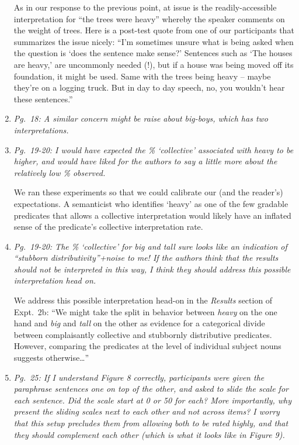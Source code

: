 \documentclass[12pt]{article}
\begin{document}
\begin{enumerate}
As in our response to the previous point, at issue is the readily-accessible interpretation for ``the trees were heavy'' whereby the speaker comments on the weight of trees. Here is a post-test quote from one of our participants that summarizes the issue nicely: ``I'm sometimes unsure what is being asked when the question is `does the sentence make sense?'  Sentences such as `The houses are heavy,' are uncommonly needed (!), but if a house was being moved off its foundation, it might be used.  Same with the trees being heavy -- maybe they're on a logging truck.  But in day to day speech, no, you wouldn't hear these sentences.''

\item \emph{Pg.~18: A similar concern might be raise about \emph{big-boys}, which has two interpretations.}



\item \emph{Pg.~19-20: I would have expected the \% `collective' associated with \emph{heavy} to be higher, and would have liked for the authors to say a little more about the relatively low \% observed.}

We ran these experiments so that we could calibrate our (and the reader's) expectations. A semanticist who identifies `heavy' as one of the few gradable predicates that allows a collective interpretation would likely have an inflated sense of the predicate's collective interpretation rate.
	
\item \emph{Pg.~19-20: The \% `collective' for \emph{big} and \emph{tall} sure looks like an indication of ``stubborn distributivity''+noise to me! If the authors think that the results should not be interpreted in this way, I think they should address this possible interpretation head on.}

We address this possible interpretation head-on in the \emph{Results} section of Expt.~2b: ``We might take the split in behavior between \emph{heavy} on the one hand and \emph{big} and \emph{tall} on the other as evidence for a categorical divide between complaisantly collective and stubbornly distributive predicates. However, comparing the predicates at the level of individual subject nouns suggests otherwise\ldots''

\item \emph{Pg.~25: If I understand Figure 8 correctly, participants were given the paraphrase sentences one on top of the other, and asked to slide the scale for each sentence. Did the scale start at 0 or 50 for each? More importantly, why present the sliding scales next to each other and not across items? I worry that this setup precludes them from allowing both to be rated highly, and that they should complement each other (which is what it looks like in Figure 9).}


\end{enumerate}
\end{document}
